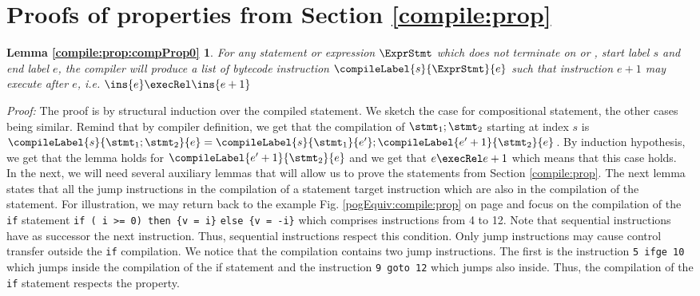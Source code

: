 \newtheorem{compPropApp}{Lemma}[section]

\newtheorem*{compProp0A}{Lemma  \ref{compile:prop:compProp0}}
\newtheorem*{compProp3A}{Lemma  \ref{compile:prop:compProp3}}
\newtheorem*{compProp8A}{Lemma  \ref{compile:prop:compProp8}}
\newtheorem*{compProp9A}{Lemma  \ref{compile:prop:compProp4}}

\section{Proofs of properties from Section \ref{compile:prop} }\label{appendix:compile:prop}


\begin{compProp0A}%
 For any statement or expression $\ExprStmt$ which does not terminate on \return{} or \athrow, start label $s$ and end label $e$,
    the compiler will produce a list of bytecode instruction $\compileLabel{s}{\ExprStmt}{e}$ such that  instruction  $e+1$ may execute after
    $e$, i.e.   $ \ins{e} \execRel \ins{e+1}$
\end{compProp0A}
\textit{Proof:} 
The proof  is by structural induction over the compiled statement.
We sketch the case for compositional statement, the other cases being similar. 
Remind that by compiler definition, we get that the compilation of $\stmt_1; \stmt_2$ starting at index $s$ is
 $\compileLabel{s}{\stmt_1; \stmt_2}{e} = \compileLabel{s}{\stmt_1}{e'};\compileLabel{e'+1}{\stmt_2}{e}$.
By  induction hypothesis, we get that the lemma holds for $\compileLabel{e'+1}{\stmt_2}{e}$ and we get that $e \execRel e+1$ 
which means that this case holds.
\Qed \\


In the next, we will need several auxiliary lemmas that will allow us to prove the statements from Section \ref{compile:prop}. 
The next lemma states that all the jump instructions in the compilation of a statement target instruction which are also 
in the compilation of the statement.
For illustration, we may return back to the example Fig. \ref{pogEquiv:compile:prop}  on page \pageref{pogEquiv:compile:prop} and focus on the 
compilation of the \lstinline!if!  statement   
\lstinline!if ( i >= 0) then {v = i}! \lstinline!else {v = -i}! 
which comprises instructions from 4 to 12. Note that sequential instructions   have as  successor the next instruction.  Thus, sequential
instructions respect this condition. 
Only jump instructions may cause control transfer outside the \lstinline!if! compilation. 
We notice that the compilation contains two jump instructions. 
The first is the instruction \lstinline!5 ifge 10! which jumps inside the compilation of the if statement
and the instruction \lstinline!9 goto 12!  which jumps also inside.
Thus, the compilation of the \lstinline!if! statement respects the property.


